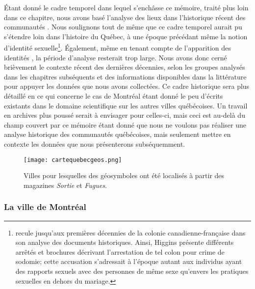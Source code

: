 Étant donné le cadre temporel dans lequel s’enchâsse ce mémoire, traité plus loin dans ce chapitre, nous avons basé l'analyse des lieux dans l'historique récent des communautés \lgbt{}.
Nous soulignons tout de même que ce cadre temporel aurait pu s'étendre loin dans l'histoire du Québec, à une époque précédant même la notion d'identité sexuelle\footnote{\citet{Higgins1999} recule jusqu'aux premières décennies de la colonie canadienne-française dans son analyse des documents historiques. 
  Ainsi, Higgins présente différents arrêtés et brochures décrivant l'arrestation de tel colon pour crime de sodomie; cette accusation s'adressait à l'époque autant aux individus ayant des rapports sexuels avec des personnes de même sexe qu'envers les pratiques sexuelles en dehors du mariage.}.
Également, même en tenant compte de l'apparition des identités \lgbt{}, la période d'analyse resterait trop large.
Nous avons donc cerné brièvement le contexte récent des dernières décennies, selon les groupes analysés dans les chapitres subséquents et des informations disponibles dans la littérature pour appuyer les données que nous avons collectées.
Ce cadre historique sera plus détaillé en ce qui concerne le cas de Montréal étant donné le peu d'écrits existants dans le domaine scientifique sur les autres villes québécoises.
Un travail en archives plus poussé serait à envisager pour celles-ci, mais ceci est au-delà du champ couvert par ce mémoire étant donné que nous ne voulons pas réaliser une analyse historique des communautés \lgbt{} québécoises, mais seulement mettre en contexte les données que nous présenterons subséquemment.

\begin{figure}[ht]
 \begin{center}
 \texttt{[image: cartequebecgeos.png]}
 \end{center}
 \caption[Villes sélections à partir de \emph{Sortie} et \emph{Fugues}.]{Villes pour lesquelles des géosymboles ont été localisés à partir des magazines \emph{Sortie} et \emph{Fugues}.}\label{fig:cartequebecgeos}
\end{figure}

\subsubsection{La ville de Montréal}
\label{ssub:montreal}

